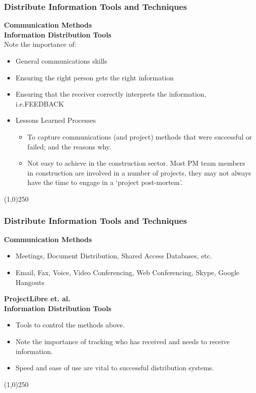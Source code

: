 \begin{frame}
\frametitle{Distribute Information \hfill\hfill Tools and Techniques}
\textbf{Communication Methods}\\
\textbf{Information Distribution Tools}\\
Note the importance of:\\
\begin{itemize}
	\item General communications skills
	\item Ensuring the right person gets the right information
	\item Ensuring that the receiver correctly interprets the information, i.e.FEEDBACK
	\item Lessons Learned Processes
	\begin{itemize}
		\item To capture communications (and project) methods that were successful or failed; and the reasons why.
		\item Not easy to achieve in the construction sector. Most PM team members in construction are involved in a number of projects, they may not always have the time to engage in a `project post-mortem'.
	\end{itemize}
\end{itemize}
\end{frame}\begin{center}\line(1,0){250}\end{center}


\begin{frame}
\frametitle{Distribute Information \hfill\hfill Tools and Techniques}
\textbf{Communication Methods}\\
\begin{itemize}
	\item Meetings, Document Distribution, Shared Access Databases, etc.
	\item Email, Fax, Voice, Video Conferencing, Web Conferencing, Skype, Google Hangouts 
\end{itemize}
\textbf{ProjectLibre et. al.}\\
\textbf{Information Distribution Tools}\\
\begin{itemize}
	\item Tools to control the methods above.
	\item Note the importance of tracking who has received and needs to receive information.
	\item Speed and ease of use are vital to successful distribution systems.
\end{itemize}
\end{frame}\begin{center}\line(1,0){250}\end{center}




